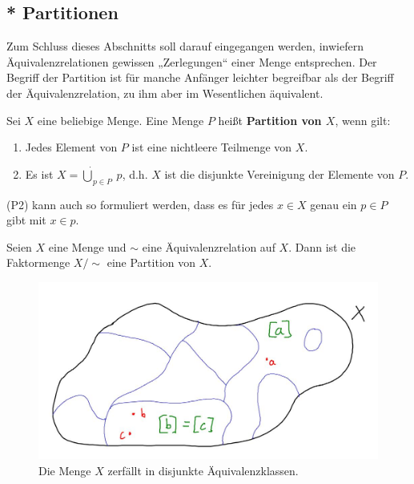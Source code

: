 \subsection*{* Partitionen}


Zum Schluss dieses Abschnitts soll darauf eingegangen werden, inwiefern Äquivalenzrelationen gewissen „Zerlegungen“ einer Menge entsprechen. Der Begriff der Partition ist für manche Anfänger leichter begreifbar als der Begriff der Äquivalenzrelation, zu ihm aber im Wesentlichen äquivalent.


\begin{de}[Partition] 
    Sei $X$ eine beliebige Menge. Eine Menge $P$ heißt \textbf{Partition von $X$}, wenn gilt:
    \begin{enumerate}[label=(P\arabic*), labelindent=1.5em, leftmargin=*]
        \item Jedes Element von $P$ ist eine nichtleere Teilmenge von $X$.
        \item Es ist $X=\dot{\bigcup}_{p\in P}\ p$, d.h. $X$ ist die disjunkte Vereinigung der Elemente von $P$.
    \end{enumerate}
    (P2) kann auch so formuliert werden, dass es für jedes $x\in X$ genau ein $p\in P$ gibt mit $x\in p$. 
\end{de}


\begin{satz} \label{aequirelvspart}
    Seien $X$ eine Menge und $\sim$ eine Äquivalenzrelation auf $X$. Dann ist die Faktormenge $X/{\sim}$ eine Partition von $X$.
    \begin{figure}[ht]
        \includegraphics[width=12cm]{./_img/equivalence.jpeg}
        \centering \caption{Die Menge $X$ zerfällt in disjunkte Äquivalenzklassen.}
    \end{figure}
\end{satz}


